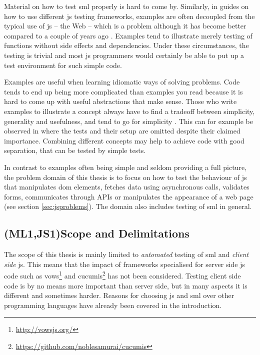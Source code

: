 \documentclass[11pt]{article}
\begin{document}
Material on how to test \gls{sml} properly is hard to come by. Similarly, in guides on how to use different \gls{js} testing frameworks, examples are often decoupled from the typical use of \gls{js} -- the Web -- which is a problem \cite[question~3]{Ekelof} although it has become better compared to a couple of years ago \cite[question~27]{Ahnve}. Examples tend to illustrate merely testing of functions without side effects and dependencies. Under these circumstances, the testing is trivial and most \gls{js} programmers would certainly be able to put up a test environment for such simple code.

Examples are useful when learning idiomatic ways of solving problems. Code tends to end up being more complicated than examples you read because it is hard to come up with useful abstractions that make sense. Those who write examples to illustrate a concept always have to find a tradeoff between simplicity, generality and usefulness, and tend to go for simplicity \cite[questions~56-57]{Edelstam}. This can for example be observed in \cite[p.~13-45]{Refactoring} where the tests and their setup are omitted despite their claimed importance. Combining different concepts may help to achieve code with good separation, that can be tested by simple tests.

In contrast to examples often being simple and seldom providing a full picture, the problem domain of this thesis is to focus on how to test the behaviour of \gls{js} that manipulates \gls{dom} elements, fetches data using asynchronous calls, validates forms, communicates through APIs or manipulates the appearance of a web page (see section \ref{sec:jsproblems}). The domain also includes testing of \gls{sml} in general.

\subsection{(ML1,JS1)Scope and Delimitations}

The scope of this thesis is mainly limited to \emph{automated} testing of \gls{sml} and \emph{client side} \gls{js}. This means that the impact of frameworks specialised for server side \gls{js} code such as vows\footnote{\url{http://vowsjs.org/}} and cucumis\footnote{\url{https://github.com/noblesamurai/cucumis}} has not been considered. Testing client side code is by no means more important than server side, but in many aspects it is different and sometimes harder. Reasons for choosing \gls{js} and \gls{sml} over other programming languages have already been covered in the introduction.
\end{document}
